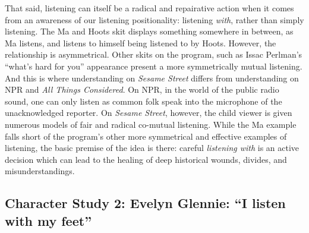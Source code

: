 \documentclass[12pt,letterpaper]{article}
\newcommand{\ses}{\textit{Sesame Street }}
\begin{document}
	That said, listening can itself be a radical and repairative action when
	it comes from an awareness of our listening positionality: listening 
	\textit{with}, rather than simply listening. The Ma and Hoots skit 
	displays something somewhere in between, as Ma listens, and listens to 
	himself being listened to by Hoots. However, the relationship is 
	asymmetrical. Other skits on the program, such as Issac Perlman's 
	``what's hard for you'' appearance present a more symmetrically mutual 
	listening. And this is where understanding on \ses differs from 
	understanding on NPR and \textit{All Things Considered}. On NPR, in the
	world of the public radio sound, one can only listen as common folk 
	speak into the microphone of the unacknowledged reporter. On 
	\textit{Sesame Street}, 
	however, the child viewer is given numerous models of fair and radical 
	co-mutual listening. While the Ma example falls short of the program's 
	other more symmetrical and effective examples of listening, the basic 
	premise
	of the idea is there: careful \textit{listening with} is an active
	decision which can lead to the healing of deep historical wounds, 
	divides, and misunderstandings.

	\subsection*{Character Study 2: Evelyn Glennie: ``I listen with my feet''} 



\newpage
\singlespacing
\printbibliography
\end{document}
